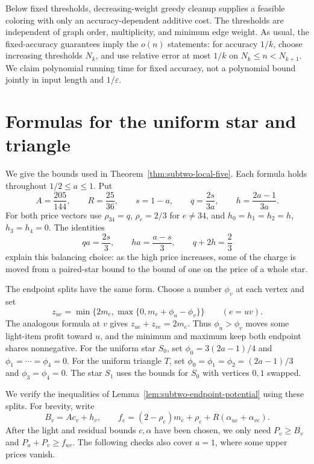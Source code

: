 \documentclass[11pt]{article}
\theoremstyle{definition}\newtheorem{algorithm}{Algorithm}[section]
\numberwithin{equation}{section}
\theoremstyle{remark}\newtheorem*{remark}{Remark}
\begin{document}
Below fixed thresholds, decreasing-weight greedy cleanup supplies a
feasible coloring with only an accuracy-dependent additive cost.
The thresholds are independent of graph order, multiplicity, and minimum
edge weight. As usual, the fixed-accuracy guarantees imply the $o(n)$
statements: for accuracy $1/k$, choose increasing thresholds $N_k$, and
use relative error at most $1/k$ on $N_k\le n<N_{k+1}$.
We claim polynomial running time for fixed accuracy, not a polynomial
bound jointly in input length and $1/\varepsilon$.


\clearpage
\appendix
\section{Formulas for the uniform star and triangle}
\label{sec:subtwo-potential-tables}

We give the bounds used in Theorem~\ref{thm:subtwo-local-five}.
Each formula holds throughout $1/2\le a\le1$.
Put
\[
 A=\frac{205}{144},\qquad R=\frac{25}{36},\qquad
 s=1-a,\qquad q=\frac{2s}{3a},\qquad h=\frac{2a-1}{3a}.
\]
For both price vectors use $\rho_{34}=q$, $\rho_e=2/3$ for $e\ne34$,
and $h_0=h_1=h_2=h$, $h_3=h_4=0$.
The identities
\[
 qa=\frac{2s}{3},\qquad ha=\frac{a-s}{3},\qquad
 q+2h=\frac23
\]
explain this balancing choice: as the high price increases, some of
the charge is moved from a paired-star bound to the bound of one on
the price of a whole star.

The endpoint splits have the same form. Choose a number $\phi_v$
at each vertex and set
\begin{equation}\label{eq:subtwo-offset-split}
 z_{ue}=\min\{2m_e,\max\{0,m_e+\phi_u-\phi_v\}\}
                           \qquad(e=uv).
\end{equation}
The analogous formula at $v$ gives $z_{ue}+z_{ve}=2m_e$.
Thus $\phi_u>\phi_v$ moves some light-item profit toward $u$,
and the minimum and maximum keep both endpoint shares nonnegative.
For the uniform star $S_0$, set
$\phi_0=3(2a-1)/4$ and $\phi_1=\cdots=\phi_4=0$.
For the uniform triangle $T$, set
$\phi_0=\phi_1=\phi_2=(2a-1)/3$ and $\phi_3=\phi_4=0$.
The star $S_1$ uses the bounds for $S_0$ with vertices $0,1$ swapped.

We verify the inequalities of
Lemma~\ref{lem:subtwo-endpoint-potential} using these splits.
For brevity, write
\[
 B_v=Ac_v+h_v,\qquad
 f_e=(2-\rho_e)m_e+\rho_e+R(\alpha_{ue}+\alpha_{ve}).
\]
After the light and residual bounds $c,\alpha$ have been chosen,
we only need $P_v\ge B_v$ and $P_u+P_v\ge f_{uv}$.
The following checks also cover $a=1$, where some upper prices vanish.
\end{document}
